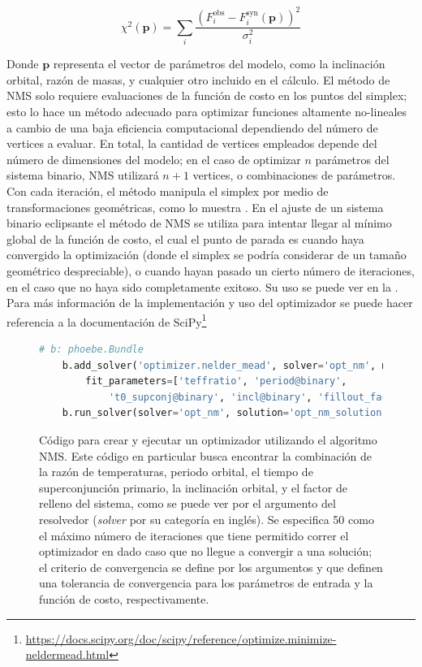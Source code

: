 \begin{eqfloat}[!ht]
	\centering
	\begin{equation}
		\chi^2(\textbf{p}) = \sum_{i}{\frac{\left(F_{i}^{\textrm{obs}} - F^{\textrm{syn}}_i(\textbf{p})\right)^2}{\sigma_{i}^2}}
	\end{equation}
	\blankcaption
	\label{ecuacionChi2Params}
\end{eqfloat}

Donde $\mathbf{p}$ representa el vector de parámetros del modelo, como la
inclinación orbital, razón de masas, y cualquier otro incluido en el cálculo. El
método de NMS solo requiere evaluaciones de la función de costo en los puntos
del simplex; esto lo hace un método adecuado para optimizar funciones altamente
no-lineales a cambio de una baja eficiencia computacional 
dependiendo del número de vertices a evaluar. En total, la cantidad
de vertices empleados depende del número de dimensiones del modelo; en el caso
de optimizar $n$ parámetros del sistema binario, NMS utilizará $n+1$ vertices, o
combinaciones de parámetros. Con cada iteración, el método manipula el simplex
por medio de transformaciones geométricas, como lo muestra
. En el ajuste de un sistema
binario eclipsante el método de NMS se utiliza para intentar llegar al mínimo
global de la función de costo, el cual el punto de parada es cuando haya
convergido la optimización (donde el simplex se podría considerar de un tamaño
geométrico despreciable), o cuando hayan pasado un cierto número de iteraciones,
en el caso que no haya sido completamente exitoso. Su uso se puede ver en la
. Para más información de la implementación y uso
del optimizador se puede hacer referencia a la documentación de
SciPy\footnote{\url{https://docs.scipy.org/doc/scipy/reference/optimize.minimize-neldermead.html}}

\begin{figure}[!ht]
	\centering
	\begin{lstlisting}[language=Python, autogobble]
	# b: phoebe.Bundle
	b.add_solver('optimizer.nelder_mead', solver='opt_nm', maxiter=50,
		fit_parameters=['teffratio', 'period@binary', 
			't0_supconj@binary', 'incl@binary', 'fillout_factor'])
	b.run_solver(solver='opt_nm', solution='opt_nm_solution')
	\end{lstlisting}
	\caption{Código para crear y ejecutar un optimizador utilizando el algoritmo
	NMS. Este código en particular busca encontrar la combinación de la razón de
	temperaturas, periodo orbital, el tiempo de superconjunción primario, la
	inclinación orbital, y el factor de relleno del sistema, como se puede ver
	por el argumento  del resolvedor (\textit{solver} por
	su categoría en inglés). Se especifica 50 como el máximo número de
	iteraciones que tiene permitido correr el optimizador en dado caso que no
	llegue a convergir a una solución; el criterio de convergencia se define por
	los argumentos  y  que definen una tolerancia de
	convergencia para los parámetros de entrada y la función de costo,
	respectivamente.}
	\label{codigoOptimizadorNMS}
\end{figure}

